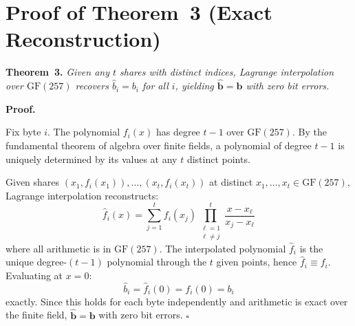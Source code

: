 \section{Proof of Theorem~3 (Exact Reconstruction)}
\label{sec:proof_thm3}

\noindent\textbf{Theorem~3.} \textit{Given any $t$ shares with distinct indices,
Lagrange interpolation over $\mathrm{GF}(257)$ recovers $\hat{b}_i = b_i$ for
all $i$, yielding $\hat{\mathbf{b}} = \mathbf{b}$ with zero bit errors.}

\noindent\textbf{Proof.}

Fix byte $i$. The polynomial $f_i(x)$ has degree $t{-}1$ over $\mathrm{GF}(257)$.
By the fundamental theorem of algebra over finite fields, a polynomial of degree
$t{-}1$ is uniquely determined by its values at any $t$ distinct points.

Given shares $(x_1, f_i(x_1)), \ldots, (x_t, f_i(x_t))$ at distinct
$x_1, \ldots, x_t \in \mathrm{GF}(257)$, Lagrange interpolation reconstructs:
\begin{equation}
  \hat{f}_i(x) = \sum_{j=1}^{t} f_i(x_j)
  \prod_{\substack{\ell=1 \\ \ell \neq j}}^{t}
  \frac{x - x_\ell}{x_j - x_\ell}
\end{equation}
where all arithmetic is in $\mathrm{GF}(257)$. The interpolated polynomial
$\hat{f}_i$ is the unique degree-$(t{-}1)$ polynomial through the $t$ given
points, hence $\hat{f}_i \equiv f_i$. Evaluating at $x = 0$:
\begin{equation}
  \hat{b}_i = \hat{f}_i(0) = f_i(0) = b_i
\end{equation}
exactly. Since this holds for each byte independently and arithmetic is exact
over the finite field, $\hat{\mathbf{b}} = \mathbf{b}$ with zero bit errors.
\hfill$\square$
